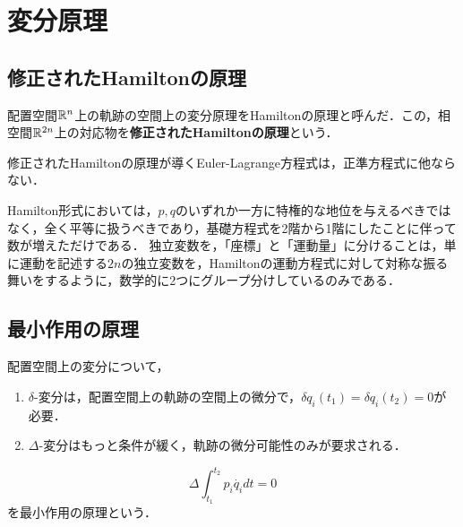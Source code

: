 \documentclass[uplatex, dvipdfmx]{jsreport}
\begin{document}
\section{変分原理}

\subsection{修正されたHamiltonの原理}

\begin{tcolorbox}[colframe=ForestGreen, colback=ForestGreen!10!white,breakable,colbacktitle=ForestGreen!40!white,coltitle=black,fonttitle=\bfseries\sffamily,
title=]
    配置空間$\mathbb{R}^n$上の軌跡の空間上の変分原理をHamiltonの原理と呼んだ．この，相空間$\mathbb{R}^{2n}$上の対応物を\textbf{修正されたHamiltonの原理}という．
\end{tcolorbox}

\begin{theorem}
    修正されたHamiltonの原理が導くEuler-Lagrange方程式は，正準方程式に他ならない．
\end{theorem}

\begin{remarks}
    Hamilton形式においては，$p,q$のいずれか一方に特権的な地位を与えるべきではなく，全く平等に扱うべきであり，基礎方程式を2階から1階にしたことに伴って数が増えただけである．
    独立変数を，「座標」と「運動量」に分けることは，単に運動を記述する$2n$の独立変数を，Hamiltonの運動方程式に対して対称な振る舞いをするように，数学的に2つにグループ分けしているのみである．
\end{remarks}

\subsection{最小作用の原理}

\begin{definition}
    配置空間上の変分について，
    \begin{enumerate}
        \item $\delta$-変分は，配置空間上の軌跡の空間上の微分で，$\delta q_i(t_1)=\delta q_i(t_2)=0$が必要．
        \item $\Delta$-変分はもっと条件が緩く，軌跡の微分可能性のみが要求される．
    \end{enumerate}
\end{definition}

\begin{axiom}
    \[\Delta\int^{t_2}_{t_1}p_i\dot{q_i}dt=0\]
    を最小作用の原理という．
\end{axiom}
\end{document}
